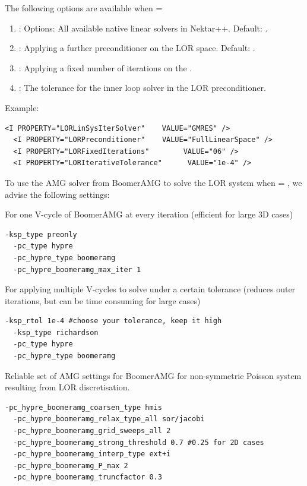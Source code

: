 The following options are available when  = 
\begin{enumerate}
  \item {}: Options: All available native linear solvers in Nektar++. Default: .
  \item {}: Applying a further preconditioner on the LOR space. Default: .
  \item {}: Applying a fixed number of iterations on the .
  \item {}: The tolerance for the inner loop solver in the LOR preconditioner.
\end{enumerate}
Example:
\begin{lstlisting}[style=XMLStyle]
  <I PROPERTY="LORLinSysIterSolver"    VALUE="GMRES" />
  <I PROPERTY="LORPreconditioner"    VALUE="FullLinearSpace" />
  <I PROPERTY="LORFixedIterations"        VALUE="06" />
  <I PROPERTY="LORIterativeTolerance"      VALUE="1e-4" />
\end{lstlisting}

To use the AMG solver from BoomerAMG to solve the LOR system when  = , we advise the following settings:

For one V-cycle of BoomerAMG at every iteration (efficient for large 3D cases)
\begin{lstlisting}[style=BashInputStyle]
  -ksp_type preonly
  -pc_type hypre
  -pc_hypre_type boomeramg
  -pc_hypre_boomeramg_max_iter 1
\end{lstlisting}

For applying multiple V-cycles to solve under a certain tolerance (reduces outer iterations, but can be time consuming for large cases)
\begin{lstlisting}[style=BashInputStyle]
  -ksp_rtol 1e-4 #choose your tolerance, keep it high
  -ksp_type richardson
  -pc_type hypre
  -pc_hypre_type boomeramg
\end{lstlisting}

Reliable set of AMG settings for BoomerAMG for non-symmetric Poisson system resulting from LOR discretisation.
\begin{lstlisting}[style=BashInputStyle]
  -pc_hypre_boomeramg_coarsen_type hmis
  -pc_hypre_boomeramg_relax_type_all sor/jacobi
  -pc_hypre_boomeramg_grid_sweeps_all 2
  -pc_hypre_boomeramg_strong_threshold 0.7 #0.25 for 2D cases
  -pc_hypre_boomeramg_interp_type ext+i
  -pc_hypre_boomeramg_P_max 2
  -pc_hypre_boomeramg_truncfactor 0.3
\end{lstlisting}